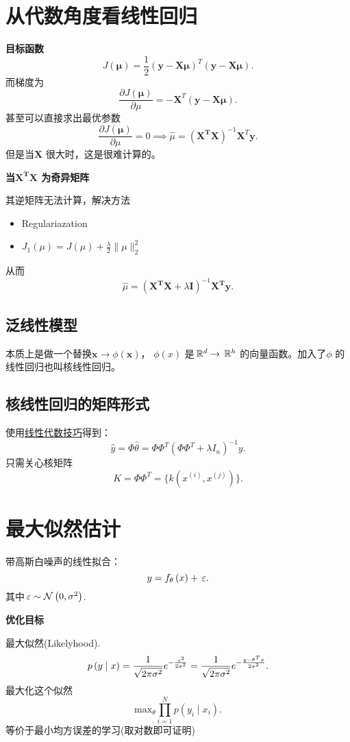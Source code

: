 \section{从代数角度看线性回归}
\noindent \textbf{目标函数} 
\[
		J\left( \bm{\mu}  \right) = \frac{1}{2} \left( \bm{y} - \bm{X\mu} \right)^{T} 
 \left( \bm{y} - \bm{X\mu} \right)
.\]
而梯度为
\[
		\frac{\partial J(\bm{\mu} )}{\partial \mu} 
		= - \bm{X}^{T} \left( \bm{y}-\bm{X\mu} \right) 
.\] 
甚至可以直接求出最优参数
\[
		\frac{\partial J(\bm{\mu} )}{\partial \mu} = 0 \implies \hat{\mu} = \left( \bm{X^{T}X} \right) ^{-1} \bm{X}^{T} \bm{y}
.\] 
但是当$\bm{X}$ 很大时，这是很难计算的。

\noindent \textbf{当$\bm{X^{T}X}$ 为奇异矩阵 }

其逆矩阵无法计算，解决方法
\begin{itemize}
		\item Regulariazation
		\item $J_1\left( \mu \right)  = J\left( \mu \right) + \frac{\lambda}{2} \|\mu\|^2_{2}  $
\end{itemize}
从而
\[
		\hat{\mu}=  \left( \bm{X^{T}X } + \lambda \bm{I} \right) ^{-1} \bm{X^{T} y}
.\] 
\subsection{泛线性模型}
本质上是做一个替换$ \bm x\to \phi\left( \bm x \right) $，
$\phi\left( x \right) $ 是$\,\mathbb{R}^{d}\to\,\mathbb{R}^{h}$
的向量函数。加入了$\phi$ 的线性回归也叫核线性回归。

\subsection{核线性回归的矩阵形式}
使用\href{https://zhuanlan.zhihu.com/p/45223109}{线性代数技巧}得到：
\[
		\hat{y} = \Phi \hat{\theta} = \Phi\Phi^{T} \left( \Phi\Phi^{T} + \lambda I_{n} \right) ^{-1} y 
.\]  
只需关心核矩阵
\[
		K = \Phi\Phi^{T} = \{ k\left( x^{(i)}, x^{(j)} \right) \} 
.\] 

\section{最大似然估计}

带高斯白噪声的线性拟合：
\[
		y = f_{\theta} \left( x \right)  + \,\varepsilon
.\] 
其中$\,\varepsilon \sim \mathcal{N} \left( 0, \sigma^2 \right) $.

\noindent \textbf{优化目标}

最大似然(Likelyhood). 
\[
		p\left( y \mid x \right) =\frac{1}{\sqrt{2\pi \sigma^2} } e^{- \frac{\,\varepsilon^2}{2\sigma^2}   }= \frac{1}{\sqrt{2\pi \sigma^2} } e^{- \frac{y-\theta^{T}x }{2\sigma^2}   }
.\] 
最大化这个似然
\[
		\mathrm{max}_{\theta} \prod_{i=1}^{N} p\left( y_{i}  \mid  x_{i} \right)  
.\] 
等价于最小均方误差的学习(取对数即可证明)

